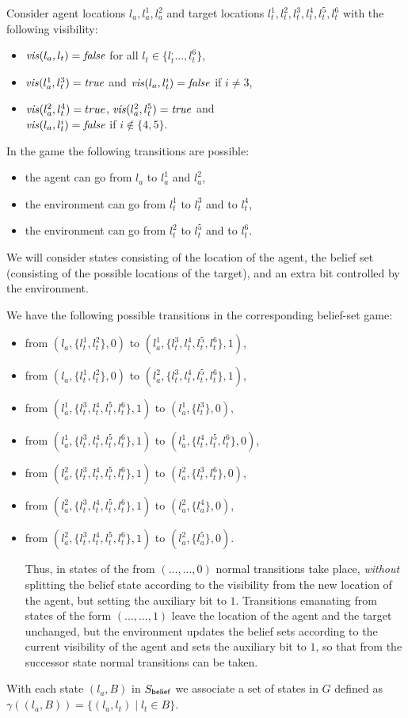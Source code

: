 \begin{example}
Consider agent locations $l_a,l_a^1,l_a^2$ and target locations 
$l_t^1,l_t^2,l_t^3,l_t^4,l_t^5,l_t^6$ with the following visibility:
\begin{itemize}
\item $\mathit{vis}(l_a,l_t) =\mathit{false}$ for all $l_t \in \{l_t^,\ldots,l_t^6\}$,
\item $\mathit{vis}(l_a^1,l_t^3) =\mathit{true}$ and $\mathit{vis}(l_a,l_t^i) =\mathit{false}$ if $i \neq 3$,
\item $\mathit{vis}(l_a^2,l_t^4) =true$, $\mathit{vis}(l_a^2,l_t^5) =\mathit{true}$ and\\ $\mathit{vis}(l_a,l_t^i) =\mathit{false}$ if $i \not \in \{4,5\}$.
\end{itemize}
In the game the following transitions are possible:
\begin{itemize}
\item the agent can go from $l_a$ to $l_a^1$ and $l_a^2$,
\item the environment can go from $l_t^1$ to $l_t^3$ and to $l_t^4$,
\item the environment can go from $l_t^2$ to $l_t^5$ and to $l_t^6$.
\end{itemize}


We will consider states consisting of the location of the agent, the belief set (consisting of the possible locations of the target), and an extra bit controlled by the environment.

We have the following  possible transitions in the corresponding belief-set game:
\begin{itemize}
\item from $(l_a,\{l_t^1,l_t^2\},0)$ to $(l_a^1,\{l_t^3,l_t^4,l_t^5,l_t^6\},1)$,
\item from $(l_a,\{l_t^1,l_t^2\},0)$ to $(l_a^2,\{l_t^3,l_t^4,l_t^5,l_t^6\},1)$,
\item from $(l_a^1,\{l_t^3,l_t^4,l_t^5,l_t^6\},1)$ to $(l_a^1,\{l_t^3\},0)$,
\item from $(l_a^1,\{l_t^3,l_t^4,l_t^5,l_t^6\},1)$ to $(l_a^1,\{l_t^4,l_t^5,l_t^6\},0)$,
\item from $(l_a^2,\{l_t^3,l_t^4,l_t^5,l_t^6\},1)$ to $(l_a^2,\{l_t^3,l_t^6\},0)$,
\item from $(l_a^2,\{l_t^3,l_t^4,l_t^5,l_t^6\},1)$ to $(l_a^2,\{l_a^4\},0)$,
\item from $(l_a^2,\{l_t^3,l_t^4,l_t^5,l_t^6\},1)$ to $(l_a^2,\{l_a^5\},0)$.

Thus, in states of the from $(...,...,0)$ normal transitions take place, \emph{without} splitting the belief state according to the visibility from the new location of the agent, but setting the auxiliary bit to $1$. Transitions emanating from states of the form $(...,...,1)$ leave the location of the agent and the target unchanged, but the environment updates the belief sets according to the current visibility of the agent and sets the auxiliary bit to $1$, so that from the successor state normal transitions can be taken.




\end{itemize}

\end{example}

With each state $(l_a,B)$ in $S_{\mathsf{belief}}$ we associate a set of states in $G$ defined as $\gamma((l_a,B)) = \{(l_a,l_t) \mid l_t \in B\}$.